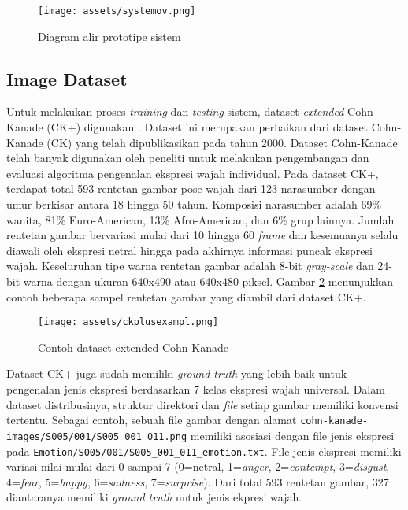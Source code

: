 \documentclass[review,3p,12pt]{elsarticle}
\begin{document}
\begin{figure}[hbt!]
\caption{Diagram alir prototipe sistem}
\label{fig:systemov}
\centering
	\texttt{[image: assets/systemov.png]}
\end{figure}

\subsection{Image Dataset}
\label{imagedataset}

Untuk melakukan proses \textit{training} dan \textit{testing} sistem, dataset \textit{extended} Cohn-Kanade (CK+) digunakan \cite{lucey2010extended}. Dataset ini merupakan perbaikan dari dataset Cohn-Kanade (CK) yang telah dipublikasikan pada tahun 2000. Dataset Cohn-Kanade telah banyak digunakan oleh peneliti untuk melakukan pengembangan dan evaluasi algoritma pengenalan ekspresi wajah individual. Pada dataset CK+, terdapat total 593 rentetan gambar pose wajah dari 123 narasumber dengan umur berkisar antara 18 hingga 50 tahun. Komposisi narasumber adalah 69\% wanita, 81\% Euro-American, 13\% Afro-American, dan 6\% grup lainnya. Jumlah rentetan gambar bervariasi mulai dari 10 hingga 60 \textit{frame} dan kesemuanya selalu diawali oleh ekspresi netral hingga pada akhirnya informasi puncak ekspresi wajah. Keseluruhan tipe warna rentetan gambar adalah 8-bit \textit{gray-scale} dan 24-bit warna dengan ukuran 640x490 atau 640x480 piksel. Gambar \ref{fig:ckplusexampl} menunjukkan contoh beberapa sampel rentetan gambar yang diambil dari dataset CK+.

\begin{figure}[b!]
\caption{Contoh dataset extended Cohn-Kanade}
\label{fig:ckplusexampl}
\centering
	\texttt{[image: assets/ckplusexampl.png]}
\end{figure}

Dataset CK+ juga sudah memiliki \textit{ground truth} yang lebih baik untuk pengenalan jenis ekspresi berdasarkan 7 kelas ekspresi wajah universal. Dalam dataset distribusinya, struktur direktori dan \textit{file} setiap gambar memiliki konvensi tertentu. Sebagai contoh, sebuah file gambar dengan alamat \texttt{cohn-kanade-images/S005/001/S005\_001\_011.png} memiliki asosiasi dengan file jenis ekspresi pada \texttt{Emotion/S005/001/S005\_001\_011\_emotion.txt}. File jenis ekspresi memiliki variasi nilai mulai dari 0 sampai 7 (0=netral, 1=\textit{anger}, 2=\textit{contempt}, 3=\textit{disgust}, 4=\textit{fear}, 5=\textit{happy}, 6=\textit{sadness}, 7=\textit{surprise}). Dari total 593 rentetan gambar, 327 diantaranya memiliki \textit{ground truth} untuk jenis ekpresi wajah.
\end{document}
